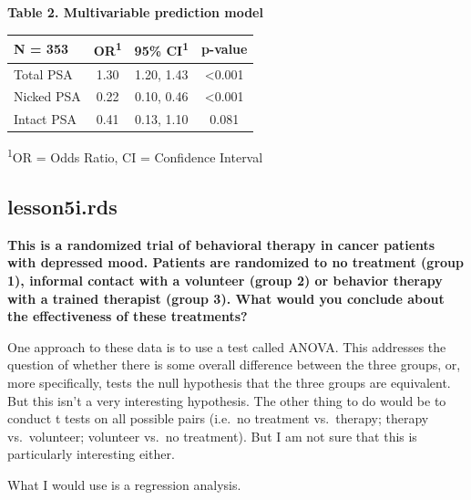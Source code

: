 \documentclass[]{book}
\begin{document}
\textbf{Table 2. Multivariable prediction model}

\captionsetup[table]{labelformat=empty,skip=1pt}
\begin{longtable}{lccc}
\toprule
\textbf{N = 353} & \textbf{OR}\textsuperscript{1} & \textbf{95\% CI}\textsuperscript{1} & \textbf{p-value} \\ 
\midrule
Total PSA & 1.30 & 1.20, 1.43 & <0.001 \\ 
Nicked PSA & 0.22 & 0.10, 0.46 & <0.001 \\ 
Intact PSA & 0.41 & 0.13, 1.10 & 0.081 \\ 
\bottomrule
\end{longtable}
\vspace{-5mm}
\begin{minipage}{\linewidth}
\textsuperscript{1}OR = Odds Ratio, CI = Confidence Interval \\ 
\end{minipage}

\hypertarget{lesson5i.rds}{%
\subsection{lesson5i.rds}\label{lesson5i.rds}}

\textbf{This is a randomized trial of behavioral therapy in cancer
patients with depressed mood. Patients are randomized to no treatment
(group 1), informal contact with a volunteer (group 2) or behavior
therapy with a trained therapist (group 3). What would you conclude
about the effectiveness of these treatments?}

One approach to these data is to use a test called ANOVA. This addresses
the question of whether there is some overall difference between the
three groups, or, more specifically, tests the null hypothesis that the
three groups are equivalent. But this isn't a very interesting
hypothesis. The other thing to do would be to conduct t tests on all
possible pairs (i.e.~no treatment vs.~therapy; therapy vs.~volunteer;
volunteer vs.~no treatment). But I am not sure that this is particularly
interesting either.

What I would use is a regression analysis.
\end{document}
